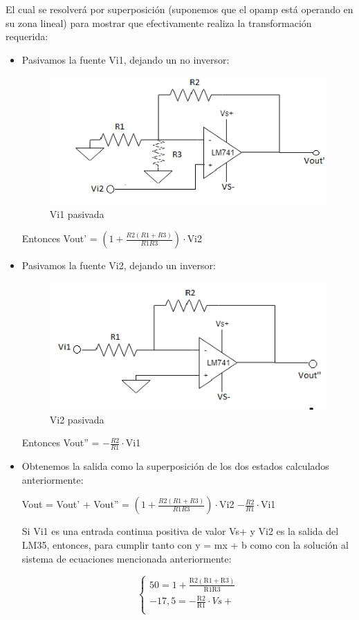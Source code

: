 \documentclass[../../main.tex]{subfiles}
\begin{document}
El cual se resolverá por superposición (suponemos que el opamp está operando en su zona lineal) para mostrar que efectivamente realiza la transformación requerida:
\begin{itemize}
\item Pasivamos la fuente Vi1, dejando un no inversor:
\begin{figure}[H]	%
	\centering
	\includegraphics[scale=1.3]{imagenes/adder_pasivo_vi1.png}
	\caption{Vi1 pasivada}
	\label{fig:ej6_adder_pasivo_vi1}
\end{figure}
Entonces Vout' = $(1+\frac{R2(R1+R3)}{R1R3})\cdot$Vi2

\item Pasivamos la fuente Vi2, dejando un inversor:
\begin{figure}[H]	%
	\centering
	\includegraphics[scale=1.3]{imagenes/adder_pasivo_vi2.png}
	\caption{Vi2 pasivada}
	\label{fig:ej6_adder_pasivo_vi2}
\end{figure}

Entonces Vout'' = $-\frac{R2}{R1}\cdot$Vi1
\item Obtenemos la salida como la superposición de los dos estados calculados anteriormente:\par
Vout = Vout' + Vout'' = $(1+\frac{R2(R1+R3)}{R1R3})\cdot$Vi2 $-\frac{R2}{R1}\cdot$Vi1\par

Si Vi1 es una entrada continua positiva de valor Vs+ y Vi2 es la salida del LM35, entonces, para cumplir tanto con y = mx + b como con la solución al sistema de ecuaciones mencionada anteriormente: \par
	 \begin{equation}
  	   \left\{
	  	    \begin{array}{ll}
		 					50 = 1+\mathrm{\frac{R2(R1+R3)}{R1R3}}\\
			 				-17,5 = \mathrm{-\frac{R2}{R1}\cdot}Vs+ \\
	     	 \end{array}
	     	\right.
 	\end{equation}


\end{itemize}
\end{document}
